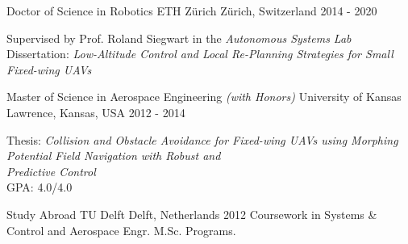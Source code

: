 

\begin{cventries}

  \cveduentry
    {Doctor of Science in Robotics} %
	{}
    {ETH Z\"{u}rich} %
    {Z\"{u}rich, Switzerland} %
    {2014 - 2020} %
    {\parbox{\linewidth}{\vspace*{0.1cm}
		Supervised by Prof. Roland Siegwart in the \emph{Autonomous Systems Lab} \\		
		Dissertation: \textit{Low-Altitude Control and Local Re-Planning Strategies for Small Fixed-wing UAVs}
        }
    }
    
  \cveduentry
    {Master of Science in Aerospace Engineering \textit{(with Honors)}} %
    {}
    {University of Kansas} %
    {Lawrence, Kansas, USA} %
    {2012 - 2014} %
    {\parbox{\linewidth}{\vspace*{0.1cm}
		Thesis: \textit{Collision and Obstacle Avoidance for Fixed-wing UAVs using Morphing Potential Field Navigation with Robust and} \\	
		\hspace*{0.9cm} \textit{Predictive Control} \\
        GPA: 4.0/4.0
        }
    }
    
  \cveduentry
    {Study Abroad} %
    {}
    {TU Delft} %
    {Delft, Netherlands} %
    {2012} %
    {Coursework in Systems \& Control and Aerospace Engr. M.Sc. Programs.}
    

\end{cventries}
